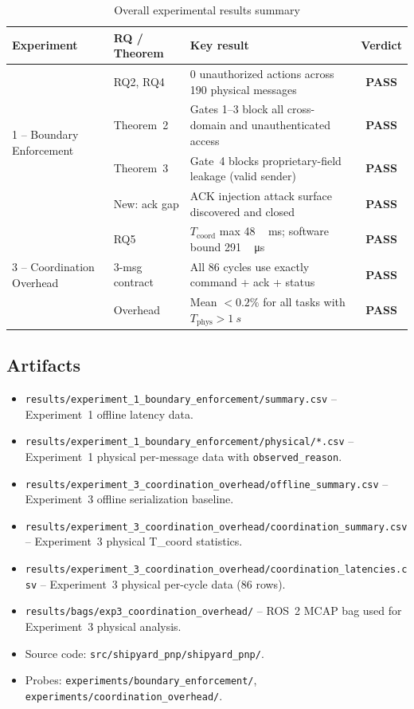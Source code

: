 \documentclass[11pt,a4paper]{article}
\newcommand{\pass}{\textcolor{passgreen}{\textbf{PASS}}}
\newcommand{\ms}{\,\si{ms}}
\begin{document}
\begin{table}[h]
\centering
\caption{Overall experimental results summary}
\label{tab:summary}
\small
\setlength{\tabcolsep}{6pt}
\begin{tabular}{@{}p{3.4cm} p{2.6cm} p{6.2cm} c@{}}
\toprule
\textbf{Experiment} & \textbf{RQ / Theorem} & \textbf{Key result} & \textbf{Verdict} \\
\midrule
\multirow{4}{3.4cm}{1 -- Boundary Enforcement}
  & RQ2, RQ4         & 0 unauthorized actions across 190 physical messages & \pass{} \\
  & Theorem~2        & Gates 1--3 block all cross-domain and unauthenticated access & \pass{} \\
  & Theorem~3        & Gate~4 blocks proprietary-field leakage (valid sender)  & \pass{} \\
  & New: ack gap     & ACK injection attack surface discovered and closed       & \pass{} \\
\midrule
\multirow{3}{3.4cm}{3 -- Coordination Overhead}
  & RQ5              & $T_{\text{coord}}$ max \SI{48}{\ms}; software bound \SI{291}{\,\micro s} & \pass{} \\
  & 3-msg contract   & All 86 cycles use exactly command + ack + status          & \pass{} \\
  & Overhead         & Mean $< 0.2\%$ for all tasks with $T_{\text{phys}} > \SI{1}{s}$        & \pass{} \\
\bottomrule
\end{tabular}
\end{table}

\subsection{Artifacts}

\begin{itemize}
  \item \texttt{results/experiment\_1\_boundary\_enforcement/summary.csv} --
    Experiment~1 offline latency data.
  \item \texttt{results/experiment\_1\_boundary\_enforcement/physical/*.csv} --
    Experiment~1 physical per-message data with \texttt{observed\_reason}.
  \item \texttt{results/experiment\_3\_coordination\_overhead/offline\_summary.csv} --
    Experiment~3 offline serialization baseline.
  \item \texttt{results/experiment\_3\_coordination\_overhead/coordination\_summary.csv} --
    Experiment~3 physical T\_coord statistics.
  \item \texttt{results/experiment\_3\_coordination\_overhead/coordination\_latencies.csv} --
    Experiment~3 physical per-cycle data (86 rows).
  \item \texttt{results/bags/exp3\_coordination\_overhead/} -- ROS~2 MCAP
    bag used for Experiment~3 physical analysis.
  \item Source code: \texttt{src/shipyard\_pnp/shipyard\_pnp/}.
  \item Probes: \texttt{experiments/boundary\_enforcement/},
    \texttt{experiments/coordination\_overhead/}.
\end{itemize}
\end{document}
